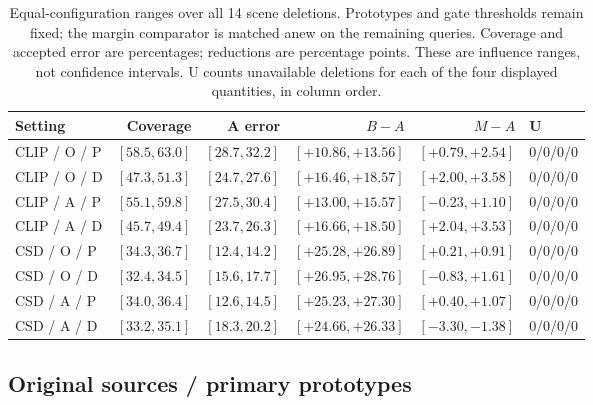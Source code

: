 \begin{table}[!htbp]
\caption{Equal-configuration ranges over all 14 scene deletions. Prototypes and gate thresholds remain fixed; the margin comparator is matched anew on the remaining queries. Coverage and accepted error are percentages; reductions are percentage points. These are influence ranges, not confidence intervals. U counts unavailable deletions for each of the four displayed quantities, in column order.}
\label{tab:selective-aggregate-influence}
\centering\footnotesize\setlength{\tabcolsep}{2pt}
\begin{tabularx}{\linewidth}{@{}Xrrrrl@{}}\toprule
Setting & Coverage & A error & $B-A$ & $M-A$ & U\\\midrule
CLIP / O / P & $[58.5, 63.0]$ & $[28.7, 32.2]$ & $[+10.86, +13.56]$ & $[+0.79, +2.54]$ & 0/0/0/0\\
CLIP / O / D & $[47.3, 51.3]$ & $[24.7, 27.6]$ & $[+16.46, +18.57]$ & $[+2.00, +3.58]$ & 0/0/0/0\\
CLIP / A / P & $[55.1, 59.8]$ & $[27.5, 30.4]$ & $[+13.00, +15.57]$ & $[-0.23, +1.10]$ & 0/0/0/0\\
CLIP / A / D & $[45.7, 49.4]$ & $[23.7, 26.3]$ & $[+16.66, +18.50]$ & $[+2.04, +3.53]$ & 0/0/0/0\\
CSD / O / P & $[34.3, 36.7]$ & $[12.4, 14.2]$ & $[+25.28, +26.89]$ & $[+0.21, +0.91]$ & 0/0/0/0\\
CSD / O / D & $[32.4, 34.5]$ & $[15.6, 17.7]$ & $[+26.95, +28.76]$ & $[-0.83, +1.61]$ & 0/0/0/0\\
CSD / A / P & $[34.0, 36.4]$ & $[12.6, 14.5]$ & $[+25.23, +27.30]$ & $[+0.40, +1.07]$ & 0/0/0/0\\
CSD / A / D & $[33.2, 35.1]$ & $[18.3, 20.2]$ & $[+24.66, +26.33]$ & $[-3.30, -1.38]$ & 0/0/0/0\\
\bottomrule\end{tabularx}
\end{table}
\FloatBarrier
\clearpage\subsection{Original sources / primary prototypes}
